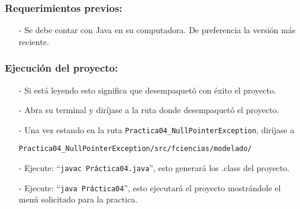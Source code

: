 \documentclass{article}
\newcommand{\code}[1]{\textcolor{white!25!black}{\texttt{#1}}}
\begin{document}
\subsubsection*{Requerimientos previos:}
\begin{itemize}
\item[-] Se debe contar con Java en su computadora. De preferencia la versión más reciente.
\end{itemize}

\subsubsection*{Ejecución del proyecto:}
\begin{itemize}
\item[-] Si está leyendo esto significa que desempaquetó con éxito el proyecto.
\item[-] Abra su terminal y diríjase a la ruta donde desempaquetó el proyecto.
\item[-] Una vez estando en la ruta \code{Practica04\_NullPointerException}, diríjase a

  \code{Practica04\_NullPointerException/src/fciencias/modelado/}
\item[-] Ejecute: “\code{javac Práctica04.java}”, esto generará los .class del proyecto.
\item[-] Ejecute: “\code{java Práctica04}”, esto ejecutará el proyecto mostrándole el menú solicitado para la practica.

\end{itemize}
\end{document}
